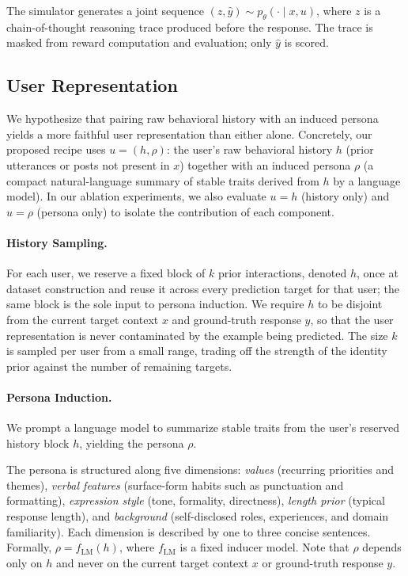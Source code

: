\documentclass{article}
\begin{document}
The simulator generates a joint sequence $(z, \hat{y}) \sim p_\theta(\cdot \mid x, u)$, where $z$ is a chain-of-thought reasoning trace produced before the response. The trace is masked from reward computation and evaluation; only $\hat{y}$ is scored.

 \subsection{User Representation}

We hypothesize that pairing raw behavioral history with an induced persona yields a more faithful user representation than either alone. Concretely, our proposed recipe uses $u = (h, \rho)$: the user's raw behavioral history $h$ (prior utterances or posts not present in $x$) together with an induced persona $\rho$ (a compact natural-language summary of stable traits derived from $h$ by a language model). In our ablation experiments, we also evaluate $u = h$ (history only) and $u = \rho$ (persona only) to isolate the contribution of each component.

\paragraph{History Sampling.}
For each user, we reserve a fixed block of $k$ prior interactions, denoted $h$, once at dataset construction and reuse it across every prediction target for that user; the same block is the sole input to persona induction. We require $h$ to be disjoint from the current target context $x$ and ground-truth response $y$, so that the user representation is never contaminated by the example being predicted. The size $k$ is sampled per user from a small range, trading off the strength of the identity prior against the number of remaining targets.

\paragraph{Persona Induction.}
We prompt a language model to summarize stable traits from the user's reserved history block $h$, yielding the persona $\rho$. 

The persona is structured along five dimensions: \emph{values} (recurring priorities and themes), \emph{verbal features} (surface-form habits such as punctuation and formatting), \emph{expression style} (tone, formality, directness), \emph{length prior} (typical response length), and \emph{background} (self-disclosed roles, experiences, and domain familiarity). Each dimension is described by one to three concise sentences. Formally, $\rho = f_{\text{LM}}(h)$, where $f_{\text{LM}}$ is a fixed inducer model. Note that $\rho$ depends only on $h$ and never on the current target context $x$ or ground-truth response $y$.
\end{document}
